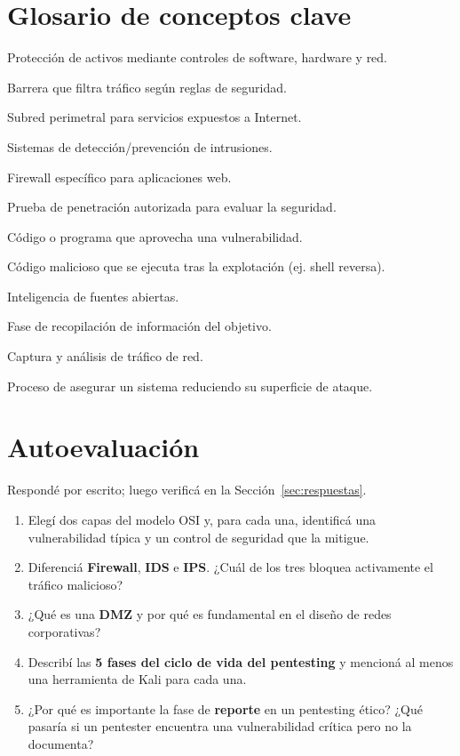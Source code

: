 \documentclass[11pt,a4paper]{article}
\begin{document}
\section{Glosario de conceptos clave}
\begin{description}[leftmargin=!, labelwidth=3.5cm, font=\bfseries]
  \item[Seguridad Lógica] Protección de activos mediante controles de software, hardware y red.
  \item[Firewall] Barrera que filtra tráfico según reglas de seguridad.
  \item[DMZ] Subred perimetral para servicios expuestos a Internet.
  \item[IDS/IPS] Sistemas de detección/prevención de intrusiones.
  \item[WAF] Firewall específico para aplicaciones web.
  \item[Pentesting] Prueba de penetración autorizada para evaluar la seguridad.
  \item[Exploit] Código o programa que aprovecha una vulnerabilidad.
  \item[Payload] Código malicioso que se ejecuta tras la explotación (ej. shell reversa).
  \item[OSINT] Inteligencia de fuentes abiertas.
  \item[Reconocimiento] Fase de recopilación de información del objetivo.
  \item[Sniffing] Captura y análisis de tráfico de red.
  \item[Hardening] Proceso de asegurar un sistema reduciendo su superficie de ataque.
\end{description}

\section{Autoevaluación}\label{sec:autoeval}
Respondé por escrito; luego verificá en la Sección~\ref{sec:respuestas}.

\begin{enumerate}[leftmargin=*]
  \item Elegí dos capas del modelo OSI y, para cada una, identificá una vulnerabilidad típica y un control de seguridad que la mitigue.
  \item Diferenciá \textbf{Firewall}, \textbf{IDS} e \textbf{IPS}. ¿Cuál de los tres bloquea activamente el tráfico malicioso?
  \item ¿Qué es una \textbf{DMZ} y por qué es fundamental en el diseño de redes corporativas?
  \item Describí las \textbf{5 fases del ciclo de vida del pentesting} y mencioná al menos una herramienta de Kali para cada una.
  \item ¿Por qué es importante la fase de \textbf{reporte} en un pentesting ético? ¿Qué pasaría si un pentester encuentra una vulnerabilidad crítica pero no la documenta?
\end{enumerate}
\end{document}
